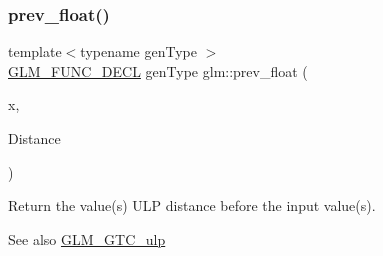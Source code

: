 \subsubsection{\texorpdfstring{prev\+\_\+float()}{prev\_float()}\hspace{0.1cm}{\footnotesize\ttfamily [2/2]}}
{\footnotesize\ttfamily template$<$typename gen\+Type $>$ \\
\hyperlink{setup_8hpp_ab2d052de21a70539923e9bcbf6e83a51}{G\+L\+M\+\_\+\+F\+U\+N\+C\+\_\+\+D\+E\+CL} gen\+Type glm\+::prev\+\_\+float (\begin{DoxyParamCaption}\item[{gen\+Type const \&}]{x,  }\item[{\hyperlink{group__core__precision_ga4fd29415871152bfb5abd588334147c8}{uint} const \&}]{Distance }\end{DoxyParamCaption})}

Return the value(s) U\+LP distance before the input value(s). \begin{DoxySeeAlso}{See also}
\hyperlink{group__gtc__ulp}{G\+L\+M\+\_\+\+G\+T\+C\+\_\+ulp} 
\end{DoxySeeAlso}
